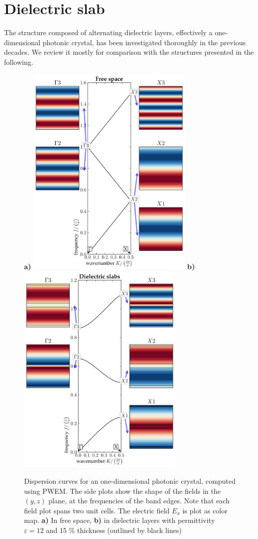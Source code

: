 
\section{Dielectric slab} %
The structure composed of alternating dielectric layers, effectively a one-dimensional photonic crystal, has been investigated thoroughly in the previous decades. We review it mostly for comparison with the structures presented in the following. 

\begin{figure}[ht] \caption{Dispersion curves for an one-dimensional photonic crystal, computed using PWEM. The side plots show the shape of the fields in the $(y,z)$ plane, at the frequencies of the band edges. Note that each field plot spans two unit cells. The electric field $E_x$ is plot as color map. \textbf{a)} In free space, \textbf{b)} in dielectric layers with permittivity $\varepsilon = 12$ and 15 \% thickness (outlined by black lines)} \label{fg_1dbd} \centering 
\textbf{a)}	\includegraphics[width=8cm]{img/Slab_eps001_PWEM.pdf}
\textbf{b)}	\includegraphics[width=8cm]{img/Slab_eps012_d15.pdf}
\end{figure}

